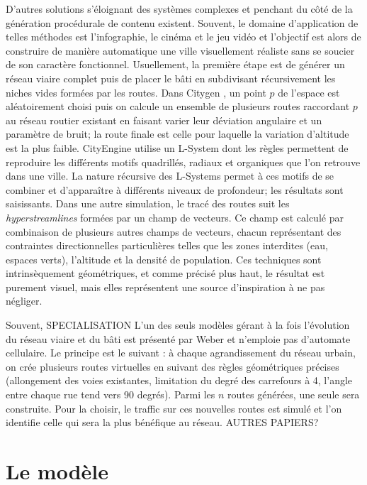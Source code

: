 \documentclass[10pt]{article}
\begin{document}
D'autres solutions s'éloignant des systèmes complexes et penchant du
côté de la génération procédurale de contenu existent. Souvent, le
domaine d'application de telles méthodes est l'infographie, le cinéma
et le jeu vidéo et l'objectif est alors de construire de manière
automatique une ville visuellement réaliste sans se soucier de son
caractère fonctionnel. Usuellement, la première étape est de générer
un réseau viaire complet puis de placer le bâti en subdivisant
récursivement les niches vides formées par les routes. Dans Citygen
\cite{Kelly2007}, un point $p$ de l'espace est aléatoirement choisi
puis on calcule un ensemble de plusieurs routes raccordant $p$ au
réseau routier existant en faisant varier leur déviation angulaire et
un paramètre de bruit; la route finale est celle pour laquelle la
variation d'altitude est la plus faible. CityEngine \cite{Parish2001}
utilise un L-System dont les règles permettent de reproduire les
différents motifs quadrillés, radiaux et organiques que l'on retrouve
dans une ville. La nature récursive des L-Systems permet à ces motifs
de se combiner et d'apparaître à différents niveaux de profondeur; les
résultats sont saisissants. Dans une autre simulation, le tracé des
routes suit les \textit{hyperstreamlines} \cite{Chen2008} formées par
un champ de vecteurs. Ce champ est calculé par combinaison de
plusieurs autres champs de vecteurs, chacun représentant des
contraintes directionnelles particulières telles que les zones
interdites (eau, espaces verts), l'altitude et la densité de
population. Ces techniques sont intrinsèquement géométriques, et comme
précisé plus haut, le résultat est purement visuel, mais elles
représentent une source d'inspiration à ne pas négliger.

Souvent, SPECIALISATION L'un des seuls modèles gérant à la fois
l'évolution du réseau viaire et du bâti est présenté par Weber
\cite{Weber2009} et n'emploie pas d'automate cellulaire. Le principe
est le suivant : à chaque agrandissement du réseau urbain, on crée
plusieurs routes virtuelles en suivant des règles géométriques
précises (allongement des voies existantes, limitation du degré des
carrefours à 4, l'angle entre chaque rue tend vers 90 degrés). Parmi
les $n$ routes générées, une seule sera construite. Pour la choisir,
le traffic sur ces nouvelles routes est simulé et l'on identifie celle
qui sera la plus bénéfique au réseau. AUTRES PAPIERS?

\section{Le modèle}
\end{document}

